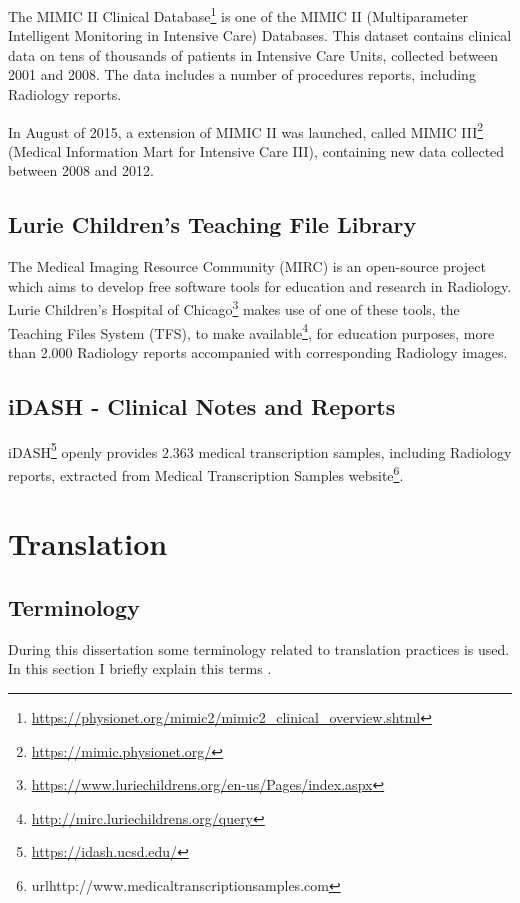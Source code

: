 The MIMIC II Clinical Database\footnote{\url{https://physionet.org/mimic2/mimic2\_clinical\_overview.shtml}} is one of the MIMIC II (Multiparameter Intelligent Monitoring in Intensive Care) Databases. This dataset contains clinical data on tens of thousands of patients in Intensive Care Units, collected between 2001 and 2008. The data includes a number of procedures reports, including Radiology reports. 

In August of 2015, a extension of MIMIC II was launched, called MIMIC III\footnote{\url{https://mimic.physionet.org/}} (Medical Information Mart for Intensive Care III)\citep{Johnson2016}, containing new data collected between 2008 and 2012.

\subsection{Lurie Children's Teaching File Library}

The Medical Imaging Resource Community (MIRC) is an open-source project which aims to develop free software tools for education and research in Radiology. Lurie Children's Hospital of Chicago\footnote{\url{https://www.luriechildrens.org/en-us/Pages/index.aspx}} makes use of one of these tools, the Teaching Files System (TFS), to make available\footnote{\url{http://mirc.luriechildrens.org/query}}, for education purposes, more than 2.000 Radiology reports accompanied with corresponding Radiology images. 
 
\subsection{iDASH - Clinical Notes and Reports}

iDASH\footnote{\url{https://idash.ucsd.edu/}} openly provides 2.363 medical transcription samples, including Radiology reports, extracted from Medical Transcription Samples website\footnote{url{http://www.medicaltranscriptionsamples.com}}. 

\section{Translation}

\subsection{Terminology}

During this dissertation some terminology related to translation practices is used. In this section I briefly explain this terms \citep{Koehn2010}. 


